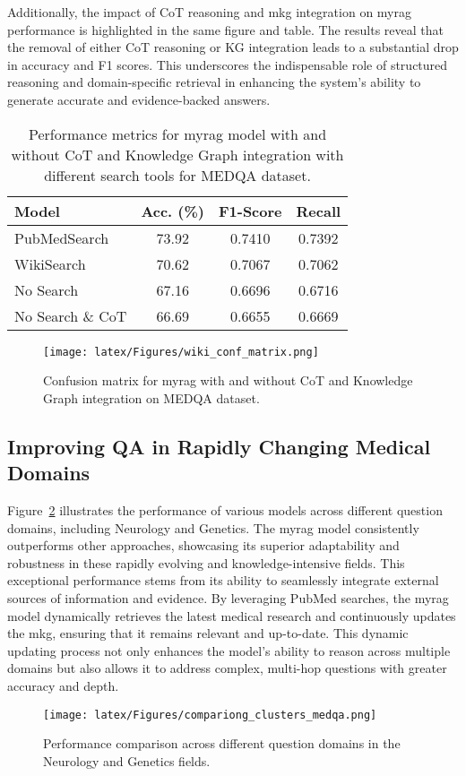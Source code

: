 Additionally, the impact of CoT reasoning and \gls{mkg} integration on \gls{myrag} performance is highlighted in the same figure and table. The results reveal that the removal of either CoT reasoning or KG integration leads to a substantial drop in accuracy and F1 scores. This underscores the indispensable role of structured reasoning and domain-specific retrieval in enhancing the system’s ability to generate accurate and evidence-backed answers.



\begin{table}[h!]
\small
    \centering
    \caption{Performance metrics for \gls{myrag} model with and without CoT and Knowledge Graph integration with different search tools for MEDQA dataset.}
    \label{tab:cot_kg_metrics}
    \begin{tabular}{lccc}
    \hline
    \textbf{Model}                  & \textbf{Acc. (\%)} & \textbf{F1-Score} & \textbf{Recall} \\
    \hline
    PubMedSearch        & 73.92                  & 0.7410            & 0.7392          \\
    WikiSearch          & 70.62                  & 0.7067            & 0.7062          \\
    No Search           & 67.16                  & 0.6696            & 0.6716          \\

    No Search \& CoT    & 66.69                  & 0.6655            & 0.6669          \\
    \hline
    \end{tabular}
\end{table}
\begin{figure}[t]
    \centering
    \texttt{[image: latex/Figures/wiki\_conf\_matrix.png]}
    \caption{Confusion matrix for \gls{myrag} with and without CoT and Knowledge Graph integration on MEDQA dataset.}
    \label{fig:cot_kg_comparison}
\end{figure}
\subsection{Improving QA in Rapidly Changing Medical Domains}

Figure~\ref{fig:performance_clusters} illustrates the performance of various models across different question domains, including Neurology and Genetics. The \gls{myrag} model consistently outperforms other approaches, showcasing its superior adaptability and robustness in these rapidly evolving and knowledge-intensive fields. This exceptional performance stems from its ability to seamlessly integrate external sources of information and evidence. By leveraging PubMed searches, the \gls{myrag} model dynamically retrieves the latest medical research and continuously updates the \gls{mkg}, ensuring that it remains relevant and up-to-date. This dynamic updating process not only enhances the model's ability to reason across multiple domains but also allows it to address complex, multi-hop questions with greater accuracy and depth.

\begin{figure}[t]
    \centering
    \texttt{[image: latex/Figures/compariong\_clusters\_medqa.png]}
    \caption{Performance comparison across different question domains in the Neurology and Genetics fields.}
    \label{fig:performance_clusters}
\end{figure}
